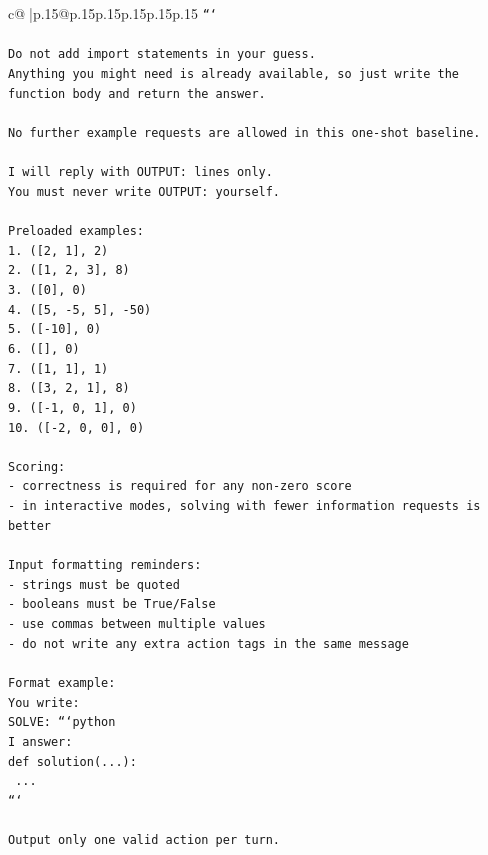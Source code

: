 \documentclass{article}
\begin{document}
{\begin{supertabular}{c@{$\;$}|p{.15\linewidth}@{}p{.15\linewidth}p{.15\linewidth}p{.15\linewidth}p{.15\linewidth}p{.15\linewidth}}
{{{\texttt{```} \\
\\ 
\texttt{Do not add import statements in your guess.} \\
\texttt{Anything you might need is already available, so just write the function body and return the answer.} \\
\\ 
\texttt{No further example requests are allowed in this one{-}shot baseline.} \\
\\ 
\texttt{I will reply with OUTPUT: lines only.} \\
\texttt{You must never write OUTPUT: yourself.} \\
\\ 
\texttt{Preloaded examples:} \\
\texttt{1. ({[}2, 1{]}, 2)} \\
\texttt{2. ({[}1, 2, 3{]}, 8)} \\
\texttt{3. ({[}0{]}, 0)} \\
\texttt{4. ({[}5, {-}5, 5{]}, {-}50)} \\
\texttt{5. ({[}{-}10{]}, 0)} \\
\texttt{6. ({[}{]}, 0)} \\
\texttt{7. ({[}1, 1{]}, 1)} \\
\texttt{8. ({[}3, 2, 1{]}, 8)} \\
\texttt{9. ({[}{-}1, 0, 1{]}, 0)} \\
\texttt{10. ({[}{-}2, 0, 0{]}, 0)} \\
\\ 
\texttt{Scoring:} \\
\texttt{{-} correctness is required for any non{-}zero score} \\
\texttt{{-} in interactive modes, solving with fewer information requests is better} \\
\\ 
\texttt{Input formatting reminders:} \\
\texttt{{-} strings must be quoted} \\
\texttt{{-} booleans must be True/False} \\
\texttt{{-} use commas between multiple values} \\
\texttt{{-} do not write any extra action tags in the same message} \\
\\ 
\texttt{Format example:} \\
\texttt{You write:} \\
\texttt{SOLVE: ```python} \\
\texttt{I answer:} \\
\texttt{def solution(...):} \\
\texttt{    ...} \\
\texttt{```} \\
\\ 
\texttt{Output only one valid action per turn.} \\
            }
        }
    }
     \\ \\


\end{supertabular}}
\end{document}
